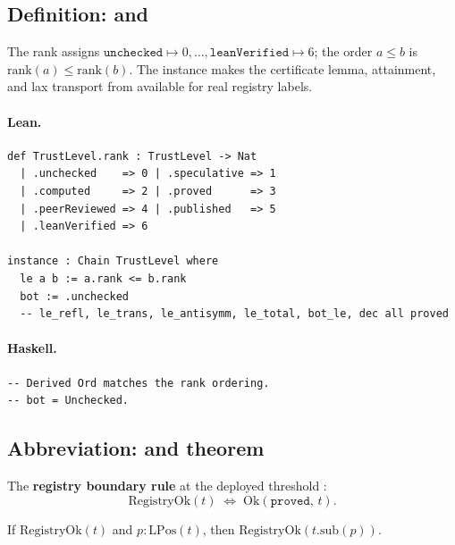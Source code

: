 \documentclass[11pt,a4paper]{article}
\begin{document}
\subsection{Definition:  and }

\begin{defn}
The rank assigns $\mathtt{unchecked} \mapsto 0,\ldots,\mathtt{leanVerified}
\mapsto 6$; the order $a \le b$ is $\mathrm{rank}(a) \le \mathrm{rank}(b)$.
The  instance makes the certificate lemma, attainment,
and lax transport from  available for real registry labels.
\end{defn}

\paragraph{Lean.}
\begin{lstlisting}[style=lean]
def TrustLevel.rank : TrustLevel -> Nat
  | .unchecked    => 0 | .speculative => 1
  | .computed     => 2 | .proved      => 3
  | .peerReviewed => 4 | .published   => 5
  | .leanVerified => 6

instance : Chain TrustLevel where
  le a b := a.rank <= b.rank
  bot := .unchecked
  -- le_refl, le_trans, le_antisymm, le_total, bot_le, dec all proved
\end{lstlisting}

\paragraph{Haskell.}
\begin{lstlisting}[style=haskell]
-- Derived Ord matches the rank ordering.
-- bot = Unchecked.
\end{lstlisting}


\subsection{Abbreviation:  and theorem }

\begin{defn}
The \textbf{registry boundary rule} at the deployed threshold :
\[
  \mathrm{RegistryOk}(t) \;\iff\; \mathrm{Ok}(\mathtt{proved},\, t).
\]
\end{defn}

\begin{thm}
If $\mathrm{RegistryOk}(t)$ and $p : \mathrm{LPos}(t)$, then
$\mathrm{RegistryOk}(t.\mathrm{sub}(p))$.
\end{thm}
\end{document}
